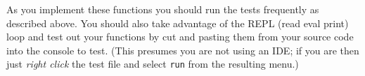 \documentclass[12pt,a4paper]{exam}
\begin{document}
As you implement these functions you should run the tests frequently as described above. 
You should also take advantage of the REPL (read eval print) loop and test out your functions by cut and 
pasting them from your source code into the console to test. (This presumes you are not using an IDE; if 
you are then just \emph{right click} the test file and select \verb!run! from the resulting menu.)
\end{document}
